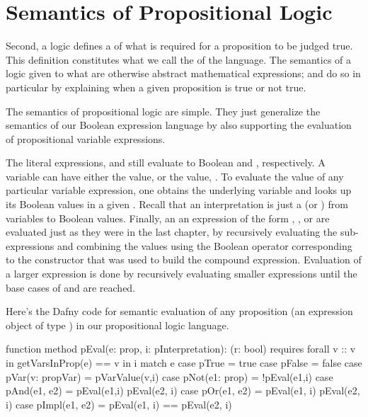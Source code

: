 \documentclass[letterpaper,10pt,english]{sphinxmanual}
\begin{document}
\section{Semantics of Propositional Logic}
\label{\detokenize{09-propositional-logic:semantics-of-propositional-logic}}
Second, a logic defines a of what is required for a proposition to be
judged true. This definition constitutes what we call the 
of the language. The semantics of a logic given  to what are
otherwise abstract mathematical expressions; and do so in particular
by explaining when a given proposition is true or not true.

The semantics of propositional logic are simple. They just generalize
the semantics of our Boolean expression language by also supporting the
evaluation of propositional variable expressions.

The literal expressions,  and  still evaluate to
Boolean  and , respectively. A variable can have either
the value,  or the value, . To evaluate the value of any
particular variable expression, one obtains the underlying variable
and looks up its Boolean values in a given .  Recall
that an interpretation is just a  (or ) from variables
to Boolean values. Finally, an an expression of the form ,
, or  are evaluated just as they were in the last
chapter, by recursively evaluating the sub-expressions and combining
the values using the Boolean operator corresponding to the constructor
that was used to build the compound expression. Evaluation of a larger
expression is done by recursively evaluating smaller expressions until
the base cases of  and  are reached.

Here’s the Dafny code for semantic evaluation of any proposition (an
expression object of type ) in our propositional logic language.

\begin{sphinxVerbatim}[commandchars=\\\{\}]
function method pEval(e: prop, i: pInterpretation): (r: bool)
     requires forall v :: v in getVarsInProp(e) ==\PYGZgt{} v in i
 \PYGZob{}
     match e
     \PYGZob{}
         case pTrue =\PYGZgt{} true
         case pFalse =\PYGZgt{} false
         case pVar(v: propVar) =\PYGZgt{} pVarValue(v,i)
         case pNot(e1: prop) =\PYGZgt{} !pEval(e1,i)
         case pAnd(e1, e2) =\PYGZgt{} pEval(e1,i) \PYGZam{}\PYGZam{} pEval(e2, i)
         case pOr(e1, e2) =\PYGZgt{}  pEval(e1, i) \textbar{}\textbar{} pEval(e2, i)
         case pImpl(e1, e2) =\PYGZgt{} pEval(e1, i) ==\PYGZgt{} pEval(e2, i)
     \PYGZcb{}
 \PYGZcb{}
\end{sphinxVerbatim}
\end{document}
